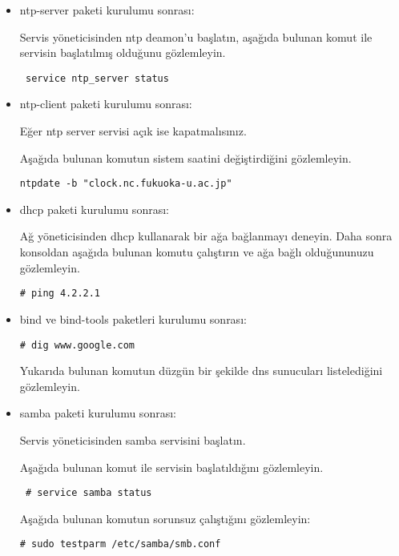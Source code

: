 \documentclass[a4paper,10pt]{article}
\begin{document}
\begin{itemize}


\item ntp-server paketi kurulumu sonrası:

Servis yöneticisinden ntp deamon'u başlatın, aşağıda bulunan komut ile servisin başlatılmış olduğunu gözlemleyin.
\begin{verbatim}
 service ntp_server status
\end{verbatim}

\item ntp-client paketi kurulumu sonrası:

Eğer ntp server servisi açık ise kapatmalısınız. 

Aşağıda bulunan komutun sistem saatini değiştirdiğini gözlemleyin. 
\begin{verbatim}
ntpdate -b "clock.nc.fukuoka-u.ac.jp" 
\end{verbatim}

 \item dhcp paketi kurulumu sonrası:

Ağ yöneticisinden dhcp kullanarak bir ağa bağlanmayı deneyin. Daha sonra konsoldan aşağıda bulunan komutu çalıştırın ve ağa bağlı olduğununuzu gözlemleyin.
\begin{verbatim}
# ping 4.2.2.1
\end{verbatim}

\item bind ve bind-tools paketleri kurulumu sonrası:
\begin{verbatim}
# dig www.google.com
\end{verbatim}
Yukarıda bulunan komutun düzgün bir şekilde dns sunucuları listelediğini gözlemleyin.
\item samba paketi kurulumu sonrası:

Servis yöneticisinden samba servisini başlatın.

Aşağıda bulunan komut ile servisin başlatıldığını gözlemleyin.
\begin{verbatim}
 # service samba status 
\end{verbatim}

 Aşağıda bulunan komutun sorunsuz çalıştığını gözlemleyin:
\begin{verbatim}
# sudo testparm /etc/samba/smb.conf
\end{verbatim}

\end{itemize}
\end{document}
